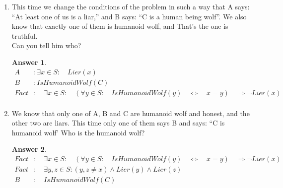 \documentclass[a4paper]{article}
\renewcommand{\(}{\left(}
\renewcommand{\)}{\right)}
\theoremstyle{plain}
\theoremstyle{plain}
\theoremstyle{definition}
\newtheorem*{answer}{Answer}
\begin{document}
\begin{enumerate}[label*=\alph*.,ref=\alph*]
\item This time we change the conditions of the problem in such a way that A says: ``At least one of us is a liar,'' and B says: ``C is a human being wolf''. We also know that exactly one of them is humanoid wolf, and That's the one is truthful. \\
Can you tell him who?
\begin{shaded}
\begin{answer}
\begin{align*}
 A &:  \exists x \in S : \quad Lier(x) \\
 B &: IsHumanoidWolf(C) \\
  Fact &: \quad \exists x \in S : \quad (\forall y \in S : \quad IsHumanoidWolf(y) \quad \Leftrightarrow \quad x = y) \quad \Rightarrow \neg Lier(x) \\
\end{align*}
\end{answer}
\end{shaded}

\item We know that only one of A, B and C  are humanoid wolf and honest, and the other two are liars. This time only one of them says B and says: ``C is humanoid wolf' Who is the humanoid wolf?
\begin{shaded}
\begin{answer}
\begin{align*}
 Fact &: \quad \exists x \in S : \quad (\forall y \in S : \quad IsHumanoidWolf(y) \quad \Leftrightarrow \quad x = y) \quad \Rightarrow \neg Lier(x) \\
 Fact &: \quad \exists y , z \in S : (y , z \neq x ) \wedge Lier(y) \wedge Lier(z) \\
 B &: \quad IsHumanoidWolf(C)
\end{align*}
\end{answer}
\end{shaded}

\end{enumerate}
\end{document}
